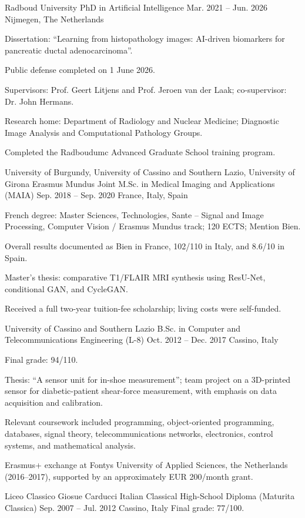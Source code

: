 
\begin{cventries}
\cventry
  {Radboud University}
  {PhD in Artificial Intelligence}
  {Mar. 2021 -- Jun. 2026}
  {Nijmegen, The Netherlands}
  {
    \begin{cvitems}
      \item {Dissertation: ``Learning from histopathology images: AI-driven biomarkers for pancreatic ductal adenocarcinoma''.}
      \item {Public defense completed on 1 June 2026.}
      \item {Supervisors: Prof. Geert Litjens and Prof. Jeroen van der Laak; co-supervisor: Dr. John Hermans.}
      \item {Research home: Department of Radiology and Nuclear Medicine; Diagnostic Image Analysis and Computational Pathology Groups.}
      \item {Completed the Radboudumc Advanced Graduate School training program.}
    \end{cvitems}
  }

\cventry
  {University of Burgundy, University of Cassino and Southern Lazio, University of Girona}
  {Erasmus Mundus Joint M.Sc. in Medical Imaging and Applications (MAIA)}
  {Sep. 2018 -- Sep. 2020}
  {France, Italy, Spain}
  {
    \begin{cvitems}
      \item {French degree: Master Sciences, Technologies, Sante -- Signal and Image Processing, Computer Vision / Erasmus Mundus track; 120 ECTS; Mention Bien.}
      \item {Overall results documented as Bien in France, 102/110 in Italy, and 8.6/10 in Spain.}
      \item {Master's thesis: comparative T1/FLAIR MRI synthesis using ResU-Net, conditional GAN, and CycleGAN.}
      \item {Received a full two-year tuition-fee scholarship; living costs were self-funded.}
    \end{cvitems}
  }

\cventry
  {University of Cassino and Southern Lazio}
  {B.Sc. in Computer and Telecommunications Engineering (L-8)}
  {Oct. 2012 -- Dec. 2017}
  {Cassino, Italy}
  {
    \begin{cvitems}
      \item {Final grade: 94/110.}
      \item {Thesis: ``A sensor unit for in-shoe measurement''; team project on a 3D-printed sensor for diabetic-patient shear-force measurement, with emphasis on data acquisition and calibration.}
      \item {Relevant coursework included programming, object-oriented programming, databases, signal theory, telecommunications networks, electronics, control systems, and mathematical analysis.}
      \item {Erasmus+ exchange at Fontys University of Applied Sciences, the Netherlands (2016--2017), supported by an approximately EUR 200/month grant.}
    \end{cvitems}
  }

\cventry
  {Liceo Classico Giosue Carducci}
  {Italian Classical High-School Diploma (Maturita Classica)}
  {Sep. 2007 -- Jul. 2012}
  {Cassino, Italy}
  {Final grade: 77/100.}
\end{cventries}
